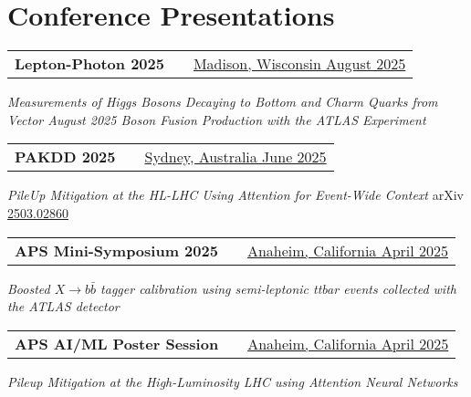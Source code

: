 \documentclass[a4paper,12pt]{article}
\makeatletter
\newenvironment{jobshort}[2]
    {
    \begin{tabularx}{\linewidth}{@{}l X r@{}}
    \textbf{#1} & \hfill &  #2 \\[3.75pt]
    \end{tabularx}
    }
    {
    }
\makeatother
\begin{document}
\section{Conference Presentations}
\begin{jobshort}{Lepton-Photon 2025}{\href{https://indico.cern.ch/event/1493037/timetable/?view=standard\#54-measurements-of-higgs-boson}{Madison, Wisconsin August 2025}}
\textit{Measurements of Higgs Bosons Decaying to Bottom and Charm Quarks from Vector August 2025 Boson Fusion Production with the ATLAS Experiment}
\end{jobshort}

\begin{jobshort}{PAKDD 2025}{\href{https://pakdd2025.org/detailed-program/day-2/}{Sydney, Australia June 2025}}
\textit{PileUp Mitigation at the HL-LHC Using Attention for Event-Wide Context} arXiv \href{https://arxiv.org/abs/2503.02860}{2503.02860}
\end{jobshort}

\begin{jobshort}{APS Mini-Symposium 2025}{\href{https://schedule.aps.org/smt/2025/events/APR-G10}{Anaheim, California April 2025}}
\textit{Boosted $X\rightarrow b\bar{b}$ tagger calibration using semi-leptonic ttbar events collected with the ATLAS detector}
\end{jobshort}

\begin{jobshort}{APS AI/ML Poster Session}{\href{https://schedule.aps.org/smt/2025/events/MAR-H00/323}{Anaheim, California April 2025}}
\textit{Pileup Mitigation at the High-Luminosity LHC using Attention Neural Networks}
\end{jobshort}

\vfill
{}
\end{document}
